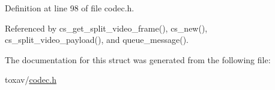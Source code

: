 Definition at line 98 of file codec.\+h.



Referenced by cs\+\_\+get\+\_\+split\+\_\+video\+\_\+frame(), cs\+\_\+new(), cs\+\_\+split\+\_\+video\+\_\+payload(), and queue\+\_\+message().



The documentation for this struct was generated from the following file\+:\begin{DoxyCompactItemize}
\item 
toxav/\hyperlink{codec_8h}{codec.\+h}\end{DoxyCompactItemize}
